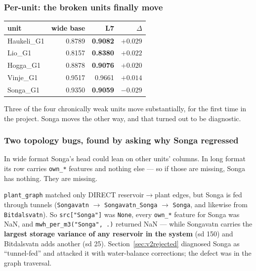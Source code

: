 \subsubsection*{Per-unit: the broken units finally move}

\begin{center}\small
\begin{tabular}{lrrr}
\toprule
unit & wide base & L7 & $\Delta$ \\
\midrule
Haukeli\_G1 & 0.8789 & \textbf{0.9082} & $+0.029$ \\
Lio\_G1     & 0.8157 & \textbf{0.8380} & $+0.022$ \\
Hogga\_G1   & 0.8878 & \textbf{0.9076} & $+0.020$ \\
Vinje\_G1   & 0.9517 & 0.9661 & $+0.014$ \\
Songa\_G1   & 0.9350 & \textbf{0.9059} & $\mathbf{-0.029}$ \\
\bottomrule
\end{tabular}
\end{center}

Three of the four chronically weak units move substantially, for the first time in the project.
Songa moves the other way, and that turned out to be diagnostic.

\subsubsection*{Two topology bugs, found by asking why Songa regressed}

In wide format Songa's head could lean on other units' columns. In long format its row carries
\texttt{own\_*} features and nothing else --- so if those are missing, Songa has nothing. They
are missing.

\begin{finding}
\texttt{plant\_graph} matched only DIRECT reservoir$\to$plant edges, but Songa is fed through
tunnels (\texttt{Songavatn} $\to$ \texttt{Songavatn\_Songa} $\to$ \texttt{Songa}, and likewise
from \texttt{Bitdalsvatn}). So \texttt{src["Songa"]} was \texttt{None}, every \texttt{own\_*}
feature for Songa was NaN, and \texttt{mwh\_per\_m3("Songa", .)} returned NaN --- while Songavatn
carries the \textbf{largest storage variance of any reservoir in the system} (sd 150) and
Bitdalsvatn adds another (sd 25). Section~\ref{sec:v2rejected} diagnosed Songa as ``tunnel-fed''
and attacked it with water-balance corrections; the defect was in the graph traversal.
\end{finding}

